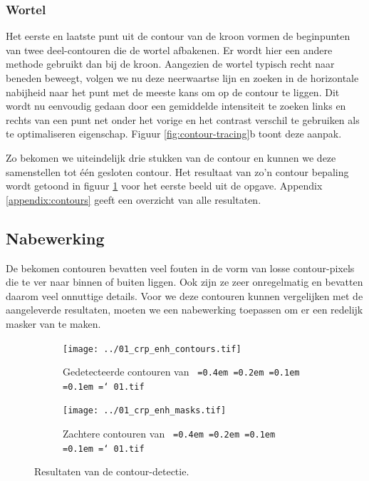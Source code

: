 \documentclass[10pt,a4paper]{article}
\newcommand*\justify{%
  \fontdimen2\font=0.4em%
  \fontdimen3\font=0.2em%
  \fontdimen4\font=0.1em%
  \fontdimen7\font=0.1em%
  \hyphenchar\font=`\-%
}
\newcommand{\ttt}[1]{{\tt \justify{#1}}}
\begin{document}
\subsubsection*{Wortel}

Het eerste en laatste punt uit de contour van de kroon vormen de beginpunten van twee deel-contouren die de wortel afbakenen. Er wordt hier een andere methode gebruikt dan bij de kroon. Aangezien de wortel typisch recht naar beneden beweegt, volgen we nu deze neerwaartse lijn en zoeken in de horizontale nabijheid naar het punt met de meeste kans om op de contour te liggen. Dit wordt nu eenvoudig gedaan door een gemiddelde intensiteit te zoeken links en rechts van een punt net onder het vorige en het contrast verschil te gebruiken als te optimaliseren eigenschap. Figuur \ref{fig:contour-tracing}b toont deze aanpak.

Zo bekomen we uiteindelijk drie stukken van de contour en kunnen we deze samenstellen tot \'e\'en gesloten contour. Het resultaat van zo'n contour bepaling wordt getoond in figuur \ref{fig:contours-01} voor het eerste beeld uit de opgave. Appendix \ref{appendix:contours} geeft een overzicht van alle resultaten.

\subsection*{Nabewerking}

De bekomen contouren bevatten veel fouten in de vorm van losse contour-pixels die te ver naar binnen of buiten liggen. Ook zijn ze zeer onregelmatig en bevatten daarom veel onnuttige details. Voor we deze contouren kunnen vergelijken met de aangeleverde resultaten, moeten we een nabewerking toepassen om er een redelijk masker van te maken.

\begin{figure}
\centering
\begin{subfigure}{.49\textwidth}
  \centering
  \texttt{[image: ../01\_crp\_enh\_contours.tif]}
  \caption{Gedetecteerde contouren van \ttt{01.tif}}
  \label{fig:contours-01}
\end{subfigure}
\begin{subfigure}{.49\textwidth}
  \centering
  \texttt{[image: ../01\_crp\_enh\_masks.tif]}
  \caption{Zachtere contouren van \ttt{01.tif}}
  \label{fig:masks-01}
\end{subfigure}
\caption{Resultaten van de contour-detectie.}
\label{fig:results-01}
\end{figure}
\end{document}
